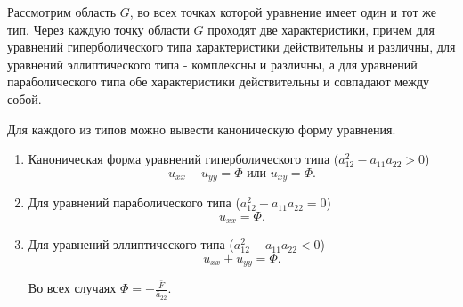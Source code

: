 Рассмотрим область $G$, во всех точках которой уравнение имеет один и тот же тип. Через каждую точку области $G$ проходят две характеристики, причем для уравнений гиперболического типа характеристики действительны и различны, для уравнений эллиптического типа - комплексны и различны, а для уравнений параболического типа обе характеристики действительны и совпадают между собой. 

Для каждого из типов можно вывести каноническую форму уравнения.
\begin{enumerate}
	\item Каноническая форма уравнений гиперболического типа ($a_{12}^2 - a_{11} a_{22} > 0$) \begin{equation}
		u_{xx} - u_{yy} = \Phi \text{ или } u_{xy} = \Phi.
	\end{equation}
	
	\item Для уравнений параболического типа ($a_{12}^2 - a_{11} a_{22} = 0$)
	\begin{equation}
		u_{xx} = \Phi.
	\end{equation}
	
	\item Для уравнений эллиптического типа ($a_{12}^2 - a_{11} a_{22} < 0$)
	\begin{equation}
		u_{xx} + u_{yy} = \Phi.
	\end{equation} 
	
	Во всех случаях $\Phi = -\frac{\bar{F}}{\bar{a}_{22}}$.
\end{enumerate}
